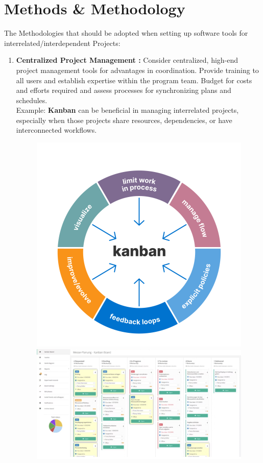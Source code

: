 \documentclass{llncs}
\begin{document}
\section{Methods \& Methodology}
The Methodologies that should be adopted when setting up software tools for interrelated/interdependent Projects:
\begin{enumerate}
      \item \textbf{Centralized Project Management :}
      \subitem Consider centralized, high-end project management tools for advantages in coordination. Provide training to all users and establish expertise within the program team. Budget for costs and efforts required and assess processes for synchronizing plans and schedules.\\
      Example: \textbf{Kanban} can be beneficial in managing interrelated projects, especially when those projects share resources, dependencies, or have interconnected workflows.
        \begin{figure}
            \includegraphics[width=0.3\linewidth]{Kanban_map.png}
            \includegraphics[width=0.75\linewidth]{KanbanBoard.png}


\end{figure}
\end{enumerate}
\end{document}

